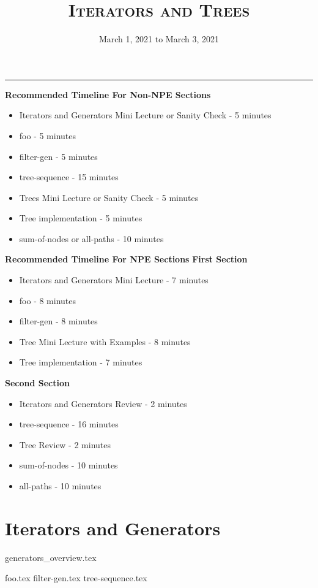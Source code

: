 \documentclass{exam}
\title{\textsc{Iterators and Trees}}
\date{March 1, 2021 to March 3, 2021}
\begin{document}
	\maketitle
	\rule{\textwidth}{0.15em}
	\fontsize{12}{15}\selectfont

\begin{guide}
	\textbf{Recommended Timeline For Non-NPE Sections}
	\begin{itemize}
		
		\item Iterators and Generators Mini Lecture or Sanity Check - 5 minutes
		\item foo - 5 minutes
		\item filter-gen - 5 minutes
		\item tree-sequence - 15 minutes
		\item Trees Mini Lecture or Sanity Check - 5 minutes
		\item Tree implementation - 5 minutes
		\item sum-of-nodes or all-paths - 10 minutes
	\end{itemize}
	\textbf{Recommended Timeline For NPE Sections}
	\textbf{First Section}
	\begin{itemize}
		
		\item Iterators and Generators Mini Lecture - 7 minutes
		\item foo - 8 minutes
		\item filter-gen - 8 minutes
		\item Tree Mini Lecture with Examples - 8 minutes
		\item Tree implementation - 7 minutes
	\end{itemize}
	\textbf{Second Section}
	\begin{itemize}
		\item Iterators and Generators Review - 2 minutes
		\item tree-sequence - 16 minutes
		\item Tree Review - 2 minutes
		\item sum-of-nodes - 10 minutes
		\item all-paths - 10 minutes
	\end{itemize}
\end{guide}

\section{Iterators and Generators}
{generators_overview.tex}
\begin{questions}
	{foo.tex}
	{filter-gen.tex}
	{tree-sequence.tex}
\end{questions}
\newpage
\end{document}

